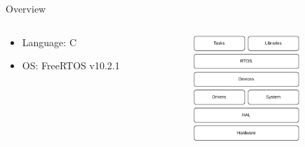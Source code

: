 %
%
%
%
%

%
%
%
%
%


\begin{frame}{Overview}

    \begin{columns}[t]
        \begin{column}[t]{0.6\textwidth}
            \begin{itemize}
                \vspace{1cm}
                \item Language: C
                \vspace{0.5cm}
                \item OS: FreeRTOS v10.2.1
            \end{itemize}
        \end{column}
        \begin{column}[t]{0.4\textwidth}
            \begin{figure}[!ht]
                \begin{center}
                    \includegraphics[width=4cm]{figures/ttc2-layers.pdf}
                \end{center}
            \end{figure}
        \end{column}
    \end{columns}

\end{frame}


